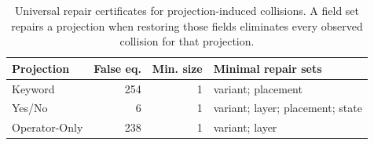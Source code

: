 \begin{table}[H]
\centering
\caption{Universal repair certificates for projection-induced collisions. A field set repairs a projection when restoring those fields eliminates every observed collision for that projection.}
\label{tab:repair-certificate}
\small
\begin{tabular}{lrr>{\raggedright\arraybackslash}p{}}
\toprule
Projection & False eq. & Min. size & Minimal repair sets \\
\midrule
Keyword & 254 & 1 & variant; placement \\
Yes/No & 6 & 1 & variant; layer; placement; state \\
Operator-Only & 238 & 1 & variant; layer \\
\bottomrule
\end{tabular}
\end{table}
